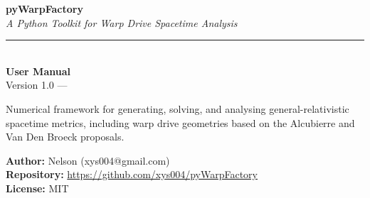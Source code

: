 \documentclass[11pt, a4paper, twoside]{report}
\begin{document}
\begin{titlepage}
  \centering
  \vspace*{2cm}

  {\Huge\bfseries pyWarpFactory}\\[0.4em]
  {\Large\itshape A Python Toolkit for Warp Drive Spacetime Analysis}\\[2.5em]

  \rule{0.6\linewidth}{1pt}\\[1.5em]

  {\LARGE\bfseries User Manual}\\[1em]
  {\large Version 1.0 \quad — }\\[3em]

  \begin{minipage}{0.75\textwidth}\centering
    \large
    Numerical framework for generating, solving, and analysing\linebreak
    general-relativistic spacetime metrics, including warp drive\linebreak
    geometries based on the Alcubierre and Van Den Broeck proposals.
  \end{minipage}

  \vfill

  {\large
    \textbf{Author:} Nelson (xys004@gmail.com)\\[0.3em]
    \textbf{Repository:} \url{https://github.com/xys004/pyWarpFactory}\\[0.3em]
    \textbf{License:} MIT
  }

  \vspace{2cm}
\end{titlepage}

\cleardoublepage

\begin{abstract}
\noindent
\textbf{pyWarpFactory} is a Python port of the MATLAB WarpFactory toolkit
originally developed for the numerical analysis of exotic spacetime metrics
in the context of General Relativity.  The library provides a modular
pipeline covering: (i) metric tensor generation for several physically
motivated spacetimes (Alcubierre warp drive, Schwarzschild black hole,
Van Den Broeck, Lentz soliton, warp shell); (ii) numerical solution of
the Einstein field equations via fourth-order finite differences,
yielding the stress-energy tensor $T^{\mu\nu}$; (iii) Eulerian frame
transformations using tetrad decomposition; and (iv) evaluation of
energy conditions (Null, Weak).  Optional GPU acceleration is supported
through CuPy as a drop-in replacement for NumPy.

This manual provides a complete reference covering installation,
physical and mathematical background, detailed API documentation with
function signatures and return types, worked code examples for every
metric, and practical guidance on grid sizing, unit conventions, and
GPU usage.
\end{abstract}
\end{document}
